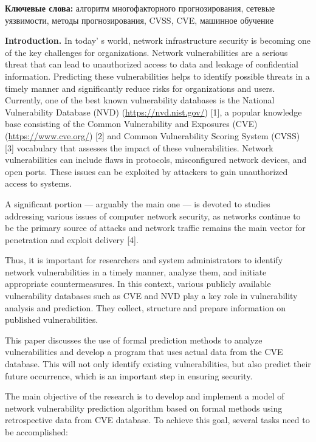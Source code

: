 {\bfseries Ключевые слова:} алгоритм многофакторного прогнозирования,
сетевые уязвимости, методы прогнозирования, CVSS, CVE, машинное обучение

\begin{multicols}{2}
{\bfseries Introduction.} In today' s world, network
infrastructure security is becoming one of the key challenges for
organizations. Network vulnerabilities are a serious threat that can
lead to unauthorized access to data and leakage of confidential
information. Predicting these vulnerabilities helps to identify possible
threats in a timely manner and significantly reduce risks for
organizations and users. Currently, one of the best known vulnerability
databases is the National Vulnerability Database (NVD)
(\url{https://nvd.nist.gov/}) {[}1{]}, a popular knowledge base
consisting of the Common Vulnerability and Exposures (CVE)
(\url{https://www.cve.org/}) {[}2{]} and Common Vulnerability Scoring
System (CVSS) {[}3{]} vocabulary that assesses the impact of these
vulnerabilities. Network vulnerabilities can include flaws in protocols,
misconfigured network devices, and open ports. These issues can be
exploited by attackers to gain unauthorized access to systems.

A significant portion --- arguably the main one --- is devoted to
studies addressing various issues of computer network security, as
networks continue to be the primary source of attacks and network
traffic remains the main vector for penetration and exploit delivery
{[}4{]}.

Thus, it is important for researchers and system administrators to
identify network vulnerabilities in a timely manner, analyze them, and
initiate appropriate countermeasures. In this context, various publicly
available vulnerability databases such as CVE and NVD play a key role in
vulnerability analysis and prediction. They collect, structure and
prepare information on published vulnerabilities.

This paper discusses the use of formal prediction methods to analyze
vulnerabilities and develop a program that uses actual data from the CVE
database. This will not only identify existing vulnerabilities, but also
predict their future occurrence, which is an important step in ensuring
security.

The main objective of the research is to develop and implement a model
of network vulnerability prediction algorithm based on formal methods
using retrospective data from CVE database. To achieve this goal,
several tasks need to be accomplished:


\end{multicols}
